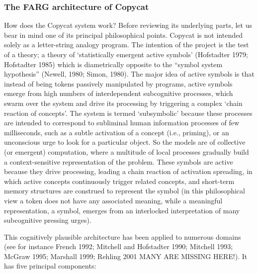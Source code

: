 \subsubsection{The FARG architecture of Copycat}

How does the Copycat system work?  Before reviewing its underlying parts, let us bear in mind one of its principal philosophical points.  Copycat is not intended solely as a letter-string analogy program.  The intention of the project is the test of a theory; a theory of `statistically emergent active symbols’ (Hofstadter 1979; Hofstadter 1985) which is diametrically opposite to the “symbol system hypothesis” (Newell, 1980; Simon, 1980).  The major idea of active symbols is that instead of being tokens passively manipulated by programs, active symbols emerge from high numbers of interdependent subcognitive processes, which swarm over the system and drive its processing by triggering a complex `chain reaction of concepts’.  The system is termed `subsymbolic’ because these processes are intended to correspond to subliminal human information processes of few milliseconds, such as a subtle activation of a concept (i.e., priming), or an unconscious urge to look for a particular object.  So the models are of collective (or emergent) computation, where a multitude of local processes gradually build a context-sensitive representation of the problem. These symbols are active because they drive processing, leading a chain reaction of activation spreading, in which active concepts continuously trigger related concepts, and short-term memory structures are construed to represent the symbol (in this philosophical view a token does not have any associated meaning, while a meaningful representation, a symbol, emerges from an interlocked interpretation of many subcognitive pressing urges).  

This cognitively plausible architecture has been applied to numerous domains (see for instance French 1992; Mitchell and Hofstadter 1990; Mitchell 1993; McGraw 1995; Marshall 1999; Rehling 2001 MANY ARE MISSING HERE!). It has five principal components: 

